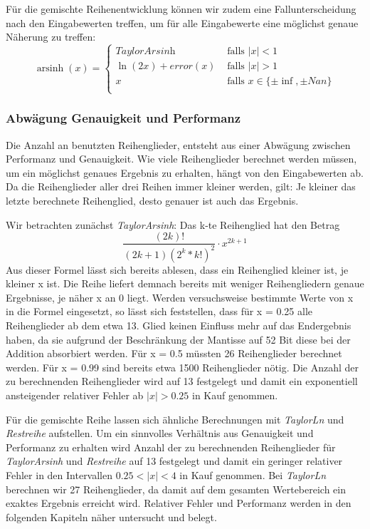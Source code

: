 \documentclass[course=erap] {aspdoc}
\begin{document}
    Für die gemischte Reihenentwicklung können wir zudem eine Fallunterscheidung nach den Eingabewerten treffen, um für alle Eingabewerte eine möglichst genaue Näherung zu treffen:
    \[ \operatorname{arsinh}(x) =
    \begin{cases}
        \textit{TaylorArsinh}     & \text{ falls } |x| < 1 \\
        \ln(2x) + error(x)  & \text{ falls } |x| >1 \\
        x     & \text{ falls } x \in \{\pm\inf, \pm Nan\}\\
    \end{cases}\]

    \subsubsection{Abwägung Genauigkeit und Performanz}
    Die Anzahl an benutzten Reihenglieder, entsteht aus einer Abwägung zwischen Performanz und Genauigkeit.
    Wie viele Reihenglieder berechnet werden müssen, um ein möglichst genaues Ergebnis zu erhalten, hängt von den Eingabewerten ab.
    Da die Reihenglieder aller drei Reihen immer kleiner werden, gilt: Je kleiner das letzte berechnete Reihenglied, desto genauer ist auch das Ergebnis.


    Wir betrachten zunächst \textit{TaylorArsinh}:
    Das k-te Reihenglied hat den Betrag
    \[
        \frac{(2k)!}{(2k + 1)(2^k*k!)^2}\cdot x^{2k+1}
    \]
    Aus dieser Formel lässt sich bereits ablesen, dass ein Reihenglied kleiner ist, je kleiner x ist.
    Die Reihe liefert demnach bereits mit weniger Reihengliedern genaue Ergebnisse, je näher x an 0 liegt.
    Werden versuchsweise bestimmte Werte von x in die Formel eingesetzt, so lässt sich feststellen, dass für x = 0.25 alle Reihenglieder ab dem etwa 13. Glied keinen Einfluss mehr auf das Endergebnis haben, da sie aufgrund der Beschränkung der Mantisse auf 52 Bit diese bei der Addition absorbiert werden.
    Für x = 0.5 müssten 26 Reihenglieder berechnet werden.
    Für x = 0.99 sind bereits etwa 1500 Reihenglieder nötig.
    Die Anzahl der zu berechnenden Reihenglieder wird auf 13 festgelegt und damit ein exponentiell ansteigender relativer Fehler ab $|x|>0.25$ in Kauf genommen.
    
    Für die gemischte Reihe lassen sich ähnliche Berechnungen mit \textit{TaylorLn} und \textit{Restreihe} aufstellen. Um ein sinnvolles Verhältnis aus Genauigkeit und Performanz zu erhalten wird Anzahl der zu berechnenden Reihenglieder für \textit{TaylorArsinh} und \textit{Restreihe} auf 13 festgelegt und damit ein geringer relativer Fehler in den Intervallen $0.25<|x|<4$ in Kauf genommen. Bei \textit{TaylorLn} berechnen wir 27 Reihenglieder, da damit auf dem gesamten Wertebereich ein exaktes Ergebnis erreicht wird.
    Relativer Fehler und Performanz werden in den folgenden Kapiteln näher untersucht und belegt.
\end{document}
